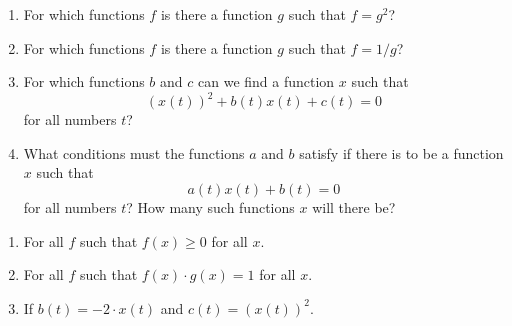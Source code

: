 \begin{pr} \label{3.10}
  \begin{enumerate}[label = (\alph*)]
    \item For which functions $f$ is there a function $g$ such that $f = g^2$?
    \item For which functions $f$ is there a function $g$ such that $f = 1/g$?
    \item For which functions $b$ and $c$ can we find a function $x$ such that
    \begin{equation*}
      (x(t))^2 + b(t)x(t) + c(t) = 0
    \end{equation*}
    for all numbers $t$?
    \item What conditions must the functions $a$ and $b$ satisfy if there is to
    be a function $x$ such that
    \begin{equation*}
      a(t)x(t) + b(t) = 0
    \end{equation*}
    for all numbers $t$? How many such functions $x$ will there be?
  \end{enumerate}
\end{pr}

\begin{solution}
  \begin{enumerate}[label = (\alph*)]
    \item For all $f$ such that $f(x) \geq 0$ for all $x$.
    \item For all $f$ such that $f(x) \cdot g(x) = 1$ for all $x$.
    \item {} If $b(t) = -2 \cdot x(t)$ and $c(t) = (x(t))^2$.
  \end{enumerate}
\end{solution}
